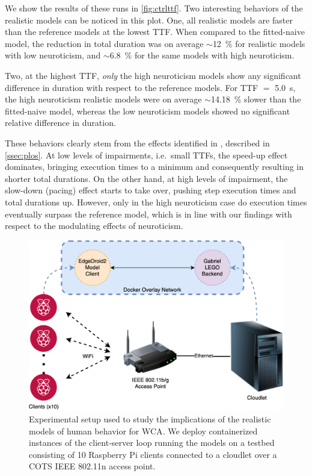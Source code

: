 We show the results of these runs in \cref{fig:ctrlttf}.
Two interesting behaviors of the realistic models can be noticed in this plot.
One, all realistic models are faster than the reference models at the lowest \gls{TTF}.
When compared to the fitted-naive model, the reduction in total duration was on average \ensuremath{\sim}\SI{12}{\percent} for realistic models with low neuroticism, and \ensuremath{\sim}\SI{6.8}{\percent} for the same models with high neuroticism.

Two, at the highest \gls{TTF}, \emph{only} the high neuroticism models show any significant difference in duration with respect to the reference models.
For \gls{TTF} \(=\) \SI{5.0}{s}, the high neuroticism realistic models were on average \ensuremath{\sim}\SI{14.18}{\percent} slower than the fitted-naive model, whereas the low neuroticism models showed no significant relative difference in duration.

These behaviors clearly stem from the effects identified in \textcite{olguinmunoz:impact2021}, described in \cref{ssec:plos}.
At low levels of impairments, i.e.\ small \glspl{TTF}, the speed-up effect dominates, bringing execution times to a minimum and consequently resulting in shorter total durations.
On the other hand, at high levels of impairment, the slow-down (pacing) effect starts to take over, pushing step execution times and total durations up.
However, only in the high neuroticism case do execution times eventually surpass the reference model, which is in line with our findings with respect to the modulating effects of neuroticism.

\medskip

\begin{figure}
    \centering
    \includegraphics[width=\columnwidth]{figs/EdgeDroid2ExperimentalSetup.png}
    \caption{%
        Experimental setup used to study the implications of the realistic models of human behavior for \gls{WCA}.
        We deploy containerized instances of the client-server loop running the models on a testbed consisting of \num{10} Raspberry Pi clients connected to a cloudlet over a \gls{COTS} \gls{IEEE} \num{802.11}n access point.
    }\label{fig:expsetup}
\end{figure}

